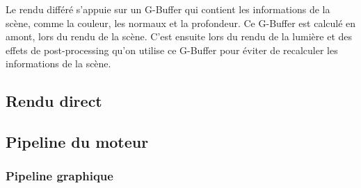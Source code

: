 Le rendu différé s'appuie sur un G-Buffer qui contient les informations de la scène,
comme la couleur, les normaux et la profondeur. Ce G-Buffer est calculé en amont, lors
du rendu de la scène. C'est ensuite lors du rendu de la lumière et des effets de
post-processing qu'on utilise ce G-Buffer pour éviter de recalculer les informations de
la scène.
\subsection{Rendu direct}
\subsection{Pipeline du moteur}
    \newpage
    \subsubsection{Pipeline graphique}
    \label{sec:graphics_pipeline}
